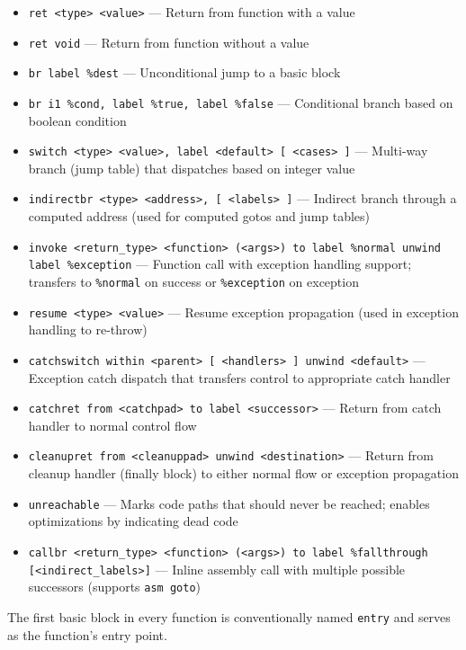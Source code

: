 \begin{itemize}[noitemsep]
  \item \texttt{ret <type> <value>} --- Return from function with a value
  \item \texttt{ret void} --- Return from function without a value
  \item \texttt{br label \%dest} --- Unconditional jump to a basic block
  \item \texttt{br i1 \%cond, label \%true, label \%false} --- Conditional branch based on boolean condition
  \item \texttt{switch <type> <value>, label <default> [ <cases> ]} --- Multi-way branch (jump table) that dispatches based on integer value
  \item \texttt{indirectbr <type> <address>, [ <labels> ]} --- Indirect branch through a computed address (used for computed gotos and jump tables)
  \item \texttt{invoke <return\_type> <function> (<args>) to label \%normal unwind label \%exception} --- Function call with exception handling support; transfers to \texttt{\%normal} on success or \texttt{\%exception} on exception
  \item \texttt{resume <type> <value>} --- Resume exception propagation (used in exception handling to re-throw)
  \item \texttt{catchswitch within <parent> [ <handlers> ] unwind <default>} --- Exception catch dispatch that transfers control to appropriate catch handler
  \item \texttt{catchret from <catchpad> to label <successor>} --- Return from catch handler to normal control flow
  \item \texttt{cleanupret from <cleanuppad> unwind <destination>} --- Return from cleanup handler (finally block) to either normal flow or exception propagation
  \item \texttt{unreachable} --- Marks code paths that should never be reached; enables optimizations by indicating dead code
  \item \texttt{callbr <return\_type> <function> (<args>) to label \%fallthrough [<indirect\_labels>]} --- Inline assembly call with multiple possible successors (supports \texttt{asm goto})
\end{itemize}

The first basic block in every function is conventionally named \texttt{entry} and serves as the function's entry point.
